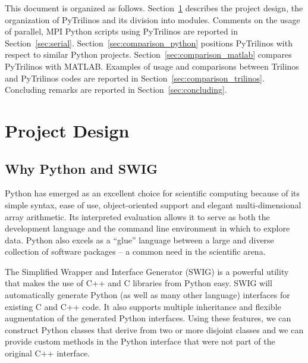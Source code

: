 \documentclass[acmtocl]{acmtrans2m}
\begin{document}
\smallskip

This document is organized as follows. Section~\ref{sec:design} describes the
project design, the organization of PyTrilinos and its division into modules.
Comments on the usage of
parallel, MPI Python scripts using PyTrilinos are reported in
Section~\ref{sec:serial}.
Section~\ref{sec:comparison_python} positions PyTrilinos with respect to similar Python projects.
Section~\ref{sec:comparison_matlab} compares PyTrilinos with MATLAB.
Examples of usage and comparisons between Trilinos
and PyTrilinos codes are reported in Section~\ref{sec:comparison_trilinos}.
Concluding remarks are reported in Section~\ref{sec:concluding}.

\section{Project Design}
\label{sec:design}

\subsection{Why Python and SWIG}
\label{sec:why}

Python has emerged as an excellent choice for scientific computing
because of its simple syntax, ease of use, object-oriented support
and elegant multi-dimensional array arithmetic. Its interpreted
evaluation allows it to serve as both the development language and
the command line environment in which to explore data. Python also
excels as a ``glue'' language between a large and diverse collection
of software packages -- a common need in the scientific arena.

The Simplified Wrapper and Interface Generator (SWIG) is a powerful
utility that makes the use of C++ and C libraries from Python easy.
SWIG will automatically generate Python (as well as many other
language) interfaces for existing C and C++ code.  It also supports
 multiple inheritance and flexible augmentation of the generated Python interfaces.
 Using these features, we can
construct Python classes that derive from two or more disjoint
classes and we can provide custom methods in the Python interface
that were not part of the original C++ interface.
\end{document}
